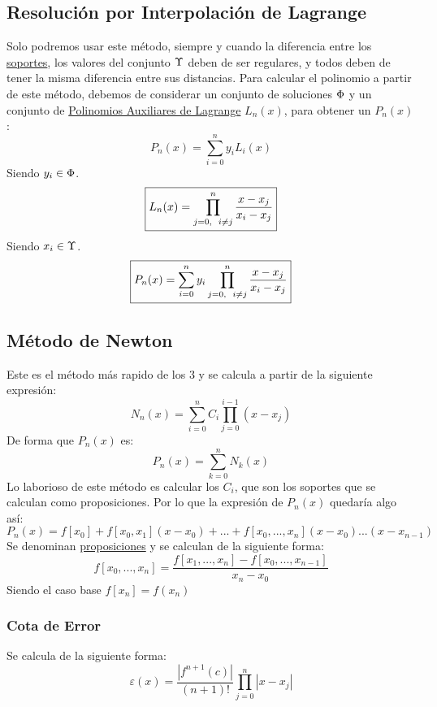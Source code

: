 \subsection{Resolución por Interpolación de Lagrange}
\noindent Solo podremos usar este método, siempre y cuando la diferencia entre los \underline{soportes}, los valores del conjunto \(\Large{\Upsilon}\) deben de ser regulares, y todos deben de tener la misma diferencia entre sus distancias.
\noindent Para calcular el polinomio a partir de este método, debemos de considerar un conjunto de soluciones \(\Large{\Phi}\) y un conjunto de \underline{Polinomios Auxiliares de Lagrange} \(L_n(x)\), para obtener un \(P_n(x)\):
\[
        \boxed{P_n(x) = \sum^n_{i=0} y_iL_i(x)}
\]
\noindent \hspace{6.2cm} Siendo \(y_i \in \Large{\Phi}\).
\[
        \boxed{L_n(x) = \prod^n_{j=0, \hspace{2mm} i \neq j} \frac{x- x_j}{x_i - x_j}}
\]
\noindent \hspace{6.2cm} Siendo \(x_i \in \Large{\Upsilon}\).
\[
        \boxed{P_n(x) = \sum^n_{i=0} y_i \prod^n_{j=0, \hspace{2mm} i \neq j} \frac{x- x_j}{x_i - x_j}}
\]
\subsection{Método de Newton}
\noindent Este es el método más rapido de los 3 y se calcula a partir de la siguiente expresión:
\[
        \boxed{N_n(x) = \sum^n_{i=0} C_i\prod^{i-1}_{j=0}(x-x_j)}
\]
\noindent De forma que \(P_n(x)\) es:
\[
        \boxed{P_n(x) = \sum^n_{k=0} N_k(x)}
\]
\noindent Lo laborioso de este método es calcular los \(C_i\), que son los soportes que se calculan como proposiciones. Por lo que la expresión de \(P_n(x)\) quedaría algo así:
\[
        \boxed{P_n(x) = f[x_0] + f[x_0,x_1](x-x_0) + ...+ f[x_0,..., x_n](x-x_0)...(x-x_{n-1})}
\]
\noindent Se denominan \underline{proposiciones} y se calculan de la siguiente forma:
\[
        \boxed{f[x_0,...,x_n] = \frac{f[x_1,...,x_n] - f[x_0,...,x_{n-1}]}{x_n - x_0}}
\]
\noindent Siendo el caso base \(f[x_n] = f(x_n)\)
\subsubsection{Cota de Error}
\noindent Se calcula de la siguiente forma:
\[
        \boxed{
        \varepsilon(x) = \frac{\left | f^{n+1}(c) \right |}{(n+1)!}\prod^n_{j=0}\left | x-x_j \right |
        }
\]
